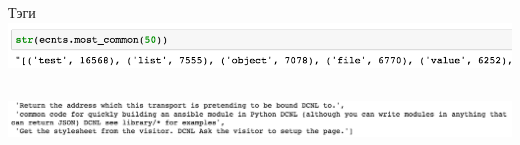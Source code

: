 \documentclass[10pt]{beamer}
\begin{document}
\begin{frame}
\begin{columns}[T]
\begin{column}[T]{0.5\textwidth}
\begin{center}
            Тэги
            \includegraphics[width=1\textwidth]{images/ecnts.png} \\
        \end{center}
    \end{column}
\end{columns}

\vskip3mm

\includegraphics[width=\textwidth]{images/docstring_example.png}

\end{frame}
\end{document}
